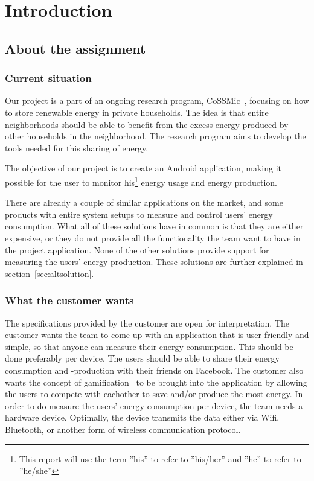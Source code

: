 \chapter{Introduction}

\section{About the assignment}
\subsection{Current situation}
Our project is a part of an ongoing research program, CoSSMic~\cite{cossmic}, focusing on how to store renewable energy in private households. The idea is that entire neighborhoods should be able to benefit from the excess energy produced by other households in the neighborhood. The research program aims to develop the tools needed for this sharing of energy. 

The objective of our project is to create an Android application, making it possible for the user to monitor his\footnote{This report will use the term ''his'' to refer to ''his/her'' and ''he'' to refer to ''he/she''} energy usage and energy production. 

There are already a couple of similar applications on the market, and some products with entire system setups to measure and control users' energy consumption. What all of these solutions have in common is that they are either expensive, or they do not provide all the functionality the team want to have in the project application. None of the other solutions provide support for measuring the users' energy production. These solutions are further explained in section~\ref{sec:altsolution}.

\subsection{What the customer wants}
The specifications provided by the customer are open for interpretation. The customer wants the team to come up with an application that is user friendly and simple, so that anyone can measure their energy consumption. This should be done preferably per device. The users should be able to share their energy consumption and -production with their friends on Facebook. The customer also wants the concept of gamification~\cite{gamification} to be brought into the application by allowing the users to compete with eachother to save and/or produce the most energy. In order to do measure the users' energy consumption per device, the team needs a hardware device. Optimally, the device transmits the data either via Wifi, Bluetooth, or another form of wireless communication protocol. 

